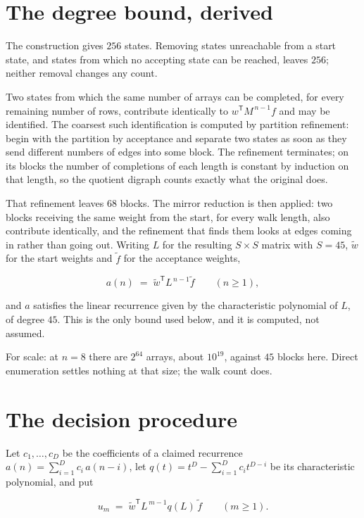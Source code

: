 \documentclass[11pt]{article}
\theoremstyle{definition}
\begin{document}
\section{The degree bound, derived}

The construction gives $256$ states. Removing states unreachable from a start state, and states from which no accepting state can be reached, leaves $256$; neither removal changes any count.

Two states from which the same number of arrays can be completed, for every remaining number of rows, contribute identically to $w^{\mathsf T}M^{\,n-1}f$ and may be identified. The coarsest such identification is computed by partition refinement: begin with the partition by acceptance and separate two states as soon as they send different numbers of edges into some block. The refinement terminates; on its blocks the number of completions of each length is constant by induction on that length, so the quotient digraph counts exactly what the original does.

That refinement leaves $68$ blocks. The mirror reduction is then applied: two blocks receiving the same weight from the start, for every walk length, also contribute identically, and the refinement that finds them looks at edges coming in rather than going out. Writing $L$ for the resulting $S \times S$ matrix with $S = 45$, $\tilde w$ for the start weights and $\tilde f$ for the acceptance weights,

\[a(n) \;=\; \tilde w^{\mathsf T} L^{\,n-1} \tilde f \qquad (n \ge 1),\]

and $a$ satisfies the linear recurrence given by the characteristic polynomial of $L$, of degree $45$. This is the only bound used below, and it is computed, not assumed.

For scale: at $n = 8$ there are $2^{64}$ arrays, about $10^{19}$, against $45$ blocks here. Direct enumeration settles nothing at that size; the walk count does.

\section{The decision procedure}

Let $c_1,\dots,c_D$ be the coefficients of a claimed recurrence $a(n) = \sum_{i=1}^{D} c_i\,a(n-i)$, let $q(t) = t^{D} - \sum_{i=1}^{D} c_i t^{D-i}$ be its characteristic polynomial, and put

\[u_m \;=\; \tilde w^{\mathsf T} L^{\,m-1} q(L)\,\tilde f \qquad (m \ge 1).\]
\end{document}
